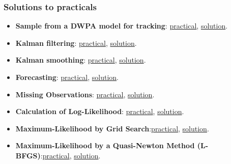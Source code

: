 \begin{frame}
    \frametitle{Solutions to practicals}

    \begin{itemize}

        \item\textbf{Sample from a DWPA model for tracking}: \hyperlink{plotSimulated1DTrajectoryDWPA}{practical}, \href{https://colab.research.google.com/github/joacorapela/lds_itba_2026/blob/main/code/notebooks/solutions/plotSimulated1DTrajectoryDWPA.ipynb}{solution}.

        \item\textbf{Kalman filtering}: \hyperlink{plotBatchFilterSimulated1DTrajectoryDWPA}{practical}, \href{https://colab.research.google.com/github/joacorapela/lds_itba_2026/blob/main/code/notebooks/solutions/plotBatchFilterSimulated1DTrajectoryDWPA.ipynb}{solution}.

        \item\textbf{Kalman smoothing}: \hyperlink{plotBatchSmoothSimulated1DTrajectoryDWPA}{practical}, \href{https://colab.research.google.com/github/joacorapela/lds_itba_2026/blob/main/code/notebooks/solutions/plotBatchSmoothSimulated1DTrajectoryDWPA.ipynb}{solution}.

        \item\textbf{Forecasting}: \hyperlink{plotBatchForecastSimulated1DTrajectoryDWPA}{practical}, \href{https://colab.research.google.com/github/joacorapela/lds_itba_2026/blob/main/code/notebooks/solutions/plotBatchForecastSimulated1DTrajectoryDWPA.ipynb}{solution}.

        \item\textbf{Missing Observations}: \hyperlink{plotBatchMissingSimulated1DTrajectoryDWPA}{practical}, \href{https://colab.research.google.com/github/joacorapela/lds_itba_2026/blob/main/code/notebooks/solutions/plotBatchMissingSimulated1DTrajectoryDWPA.ipynb}{solution}.

        \item\textbf{Calculation of Log-Likelihood}: \hyperlink{plotLogLikeSimulated1DTrajectoryDWPA}{practical}, \href{https://colab.research.google.com/github/joacorapela/lds_itba_2026/blob/main/code/notebooks/solutions/plotLogLikeSimulated1DTrajectoryDWPA.ipynb}{solution}.

        \item\textbf{Maximum-Likelihood by Grid Search}:\hyperlink{plotMLgridSearch}{practical}, \href{https://colab.research.google.com/github/joacorapela/lds_itba_2026/blob/main/code/notebooks/solutions/plotMLgridSearch.ipynb}{solution}.

        \item\textbf{Maximum-Likelihood by a Quasi-Newton Method (L-BFGS)}:\hyperlink{plotMLlbfgsColab}{practical}, \href{https://colab.research.google.com/github/joacorapela/lds_itba_2026/blob/main/code/notebooks/solutions/plotMLlbfgsColab.ipynb}{solution}.

    \end{itemize}
\end{frame}

